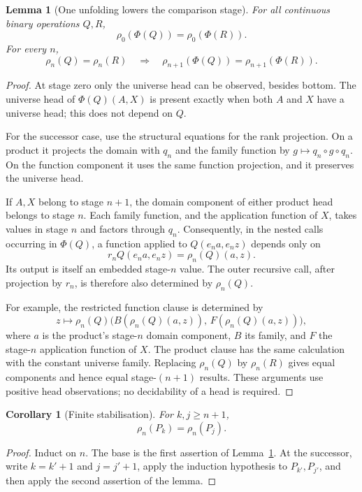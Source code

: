 \documentclass[11pt,a4paper]{article}
\newtheorem{lemma}[theorem]{Lemma}
\newtheorem{corollary}[theorem]{Corollary}
\theoremstyle{definition}
\theoremstyle{remark}
\begin{document}
\begin{lemma}[One unfolding lowers the comparison stage]\label{lem:fusion}
For all continuous binary operations $Q,R$,
\[
 \rho_0(\Phi(Q))=\rho_0(\Phi(R)).
\]
For every $n$,
\[
 \rho_n(Q)=\rho_n(R)
 \quad\Longrightarrow\quad
 \rho_{n+1}(\Phi(Q))=\rho_{n+1}(\Phi(R)).
\]
\end{lemma}
\begin{proof}
At stage zero only the universe head can be observed, besides bottom.
The universe head of $\Phi(Q)(A,X)$ is present exactly when both $A$
and $X$ have a universe head; this does not depend on $Q$.

For the successor case, use the structural equations for the rank
projection. On a product it projects the domain with $q_n$ and the
family function by $g\mapsto q_n\circ g\circ q_n$. On the function
component it uses the same function projection, and it preserves the
universe head.

If $A,X$ belong to stage $n+1$, the domain component of either product
head belongs to stage $n$. Each family function, and the application
function of $X$, takes values in stage $n$ and factors through $q_n$.
Consequently, in the nested calls occurring in $\Phi(Q)$, a function
applied to $Q(e_n a,e_n z)$ depends only on
\[
 r_n Q(e_n a,e_n z)=\rho_n(Q)(a,z).
\]
Its output is itself an embedded stage-$n$ value. The outer recursive
call, after projection by $r_n$, is therefore also determined by
$\rho_n(Q)$.

For example, the restricted function clause is determined by
\[
 z\longmapsto
 \rho_n(Q)\bigl(B(\rho_n(Q)(a,z)),\,F(\rho_n(Q)(a,z))\bigr),
\]
where $a$ is the product's stage-$n$ domain component, $B$ its family,
and $F$ the stage-$n$ application function of $X$. The product clause
has the same calculation with the constant universe family. Replacing
$\rho_n(Q)$ by $\rho_n(R)$ gives equal components and hence equal
stage-$(n+1)$ results. These arguments use positive head observations;
no decidability of a head is required.
\end{proof}

\begin{corollary}[Finite stabilisation]\label{cor:stabilisation}
For $k,j\geq n+1$,
\[
 \rho_n(P_k)=\rho_n(P_j).
\]
\end{corollary}
\begin{proof}
Induct on $n$. The base is the first assertion of
Lemma~\ref{lem:fusion}. At the successor, write $k=k'+1$ and $j=j'+1$,
apply the induction hypothesis to $P_{k'},P_{j'}$, and then apply the
second assertion of the lemma.
\end{proof}
\end{document}
